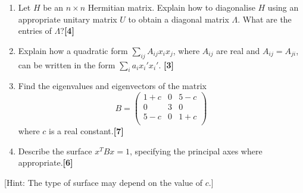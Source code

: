 \documentclass[a4paper]{article}
\begin{document}
\begin{qns}\leavevmode
\begin{enumerate}[label=(\alph*)]
\item Let $H$ be an $n\times n$ Hermitian matrix. Explain how to diagonalise $H$ using an appropriate unitary matrix $U$ to obtain a diagonal matrix $\Lambda$. What are the entries of $\Lambda$?\hfill\textbf{[4]}
\item Explain how a quadratic form $\sum_{ij}A_{ij}x_ix_j$, where $A_{ij}$ are real and $A_{ij} = A_{ji}$, can be written in the form $\sum_ia_ix_i'x_i'$. \hfill\textbf{[3]}
\item Find the eigenvalues and eigenvectors of the matrix
$$B=\begin{pmatrix}1+c&0&5-c\\0&3&0\\5-c&0&1+c\\\end{pmatrix}$$
where $c$ is a real constant.\hfill\textbf{[7]}
\item Describe the surface $x^TBx = 1$, specifying the principal axes where appropriate.\hfill\textbf{[6]}
\end{enumerate}
[Hint: The type of surface may depend on the value of $c$.] \end{qns}
\end{document}
